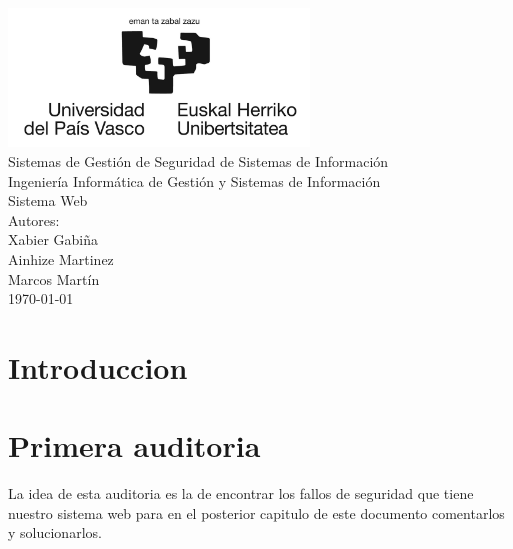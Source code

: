 \documentclass{report}
\begin{document}
    \begin{titlepage}
        \centering
        \includegraphics[width=0.6\textwidth]{./img/miscelanio/logo.jpg}\\
        \vspace{1cm}
        \LARGE Sistemas de Gestión de Seguridad de Sistemas de Información\\
        \vspace{0.5cm}
        \Large Ingeniería Informática de Gestión y Sistemas de Información\\
        \vspace{3cm}
        \Huge Sistema Web\\
        \vspace{2.5cm}
        \Large Autores:\\
        \vspace{0.2cm}
        \large Xabier Gabiña\\
        \large Ainhize Martinez\\
        \large Marcos Martín\\
        \vfill
        \today
    \end{titlepage}
    \tableofcontents
    \chapter{Introduccion}
    \chapter{Primera auditoria}
        La idea de esta auditoria es la de encontrar los fallos de seguridad que tiene nuestro sistema web para en el posterior capitulo de este documento comentarlos y solucionarlos.\\
\end{document}
